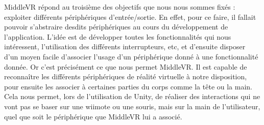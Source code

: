 MiddleVR répond au troisième des objectifs que nous nous sommes fixés : exploiter différents périphériques d'entrée/sortie. En effet, pour ce faire, il fallait pouvoir s'abstraire desdits périphériques au cours du développement de l'application. L'idée est de développer toutes les fonctionnalités qui nous intéressent, l'utilisation des différents interrupteurs, etc, et d'ensuite disposer d'un moyen facile d'associer l'usage d'un périphérique donné à une fonctionnalité donnée.\newline
Or c'est précisément ce que nous permet MiddleVR. Il est capable de reconnaître les différents périphériques de réalité virtuelle à notre disposition, pour ensuite les associer à certaines parties du corps comme la tête ou la main. Cela nous permet, lors de l'utilisation de Unity, de réaliser des interactions qui ne vont pas se  baser sur une wiimote ou une souris, mais sur la main de l'utilisateur, quel que soit le périphérique que MiddleVR lui a associé. 

